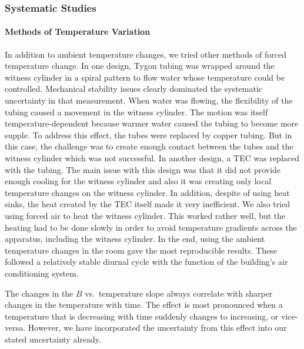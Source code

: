 %


\subsubsection{Systematic Studies\label{sec:axialsyst}}

\paragraph{Methods of Temperature Variation}

In addition to ambient temperature changes, we tried other methods of
forced temperature change.  In one design, Tygon tubing was wrapped
around the witness cylinder in a spiral pattern to flow water whose
temperature could be controlled.  Mechanical stability issues clearly
dominated the systematic uncertainty in that measurement.  When water
was flowing, the flexibility of the tubing caused a movement in the
witness cylinder.  The motion was itself temperature-dependent because
warmer water caused the tubing to become more supple.  To address this
effect, the tubes were replaced by copper tubing.  But in this case,
the challenge was to create enough contact between the tubes and the
witness cylinder which was not successful. In another design, a TEC
was replaced with the tubing. The main issue with this design was that
it did not provide enough cooling for the witness cylinder and also it
was creating only local temperature changes on the witness
cylinder. In addition, despite of using heat sinks, the heat created
by the TEC itself made it very inefficient.  We also tried using
forced air to heat the witness cylinder.  This worked rather well, but
the heating had to be done slowly in order to avoid temperature
gradients across the apparatus, including the witness cylinder.  In
the end, using the ambient temperature changes in the room gave the
most reproducible results.  These followed a relatively stable diurnal
cycle with the function of the building's air conditioning system.

The changes in the $B$ vs.~temperature slope always correlate with
sharper changes in the temperature with time.  The effect is most
pronounced when a temperature that is decreasing with time suddenly
changes to increasing, or vice-versa.  However, we have incorporated
the uncertainty from this effect into our stated uncertainty already.



